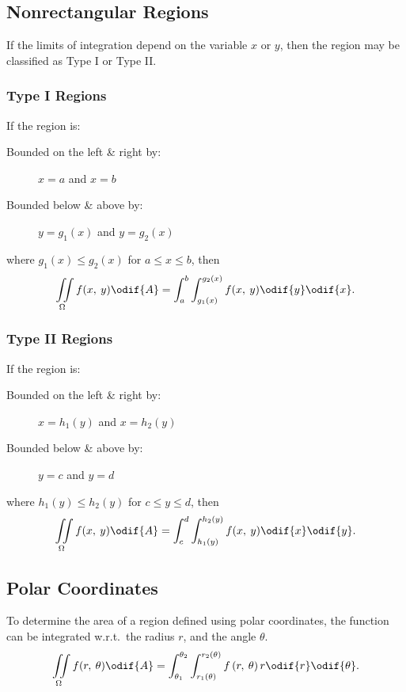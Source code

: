 \documentclass{article}
\begin{document}
\subsection{Nonrectangular Regions}
If the limits of integration depend on the variable \(x\) or \(y\), then the region
may be classified as Type I or Type II\@.
\subsubsection{Type I Regions}
If the region is:
\begin{description}
    \item[Bounded on the left \& right by:] \(x=a\) and \(x=b\)
    \item[Bounded below \& above by:] \(y=g_1(x)\) and \(y=g_2(x)\)
\end{description}
where \(g_1(x) \leq g_2(x)\) for \(a \leq x \leq b\), then
\begin{equation*}
    \iint\limits_{\Omega} f(x,\: y) \odif{A} = \int_a^b\int_{g_1(x)}^{g_2(x)} f(x,\: y) \odif{y} \odif{x}.
\end{equation*}
\subsubsection{Type II Regions}
If the region is:
\begin{description}
    \item[Bounded on the left \& right by:] \(x=h_1(y)\) and \(x=h_2(y)\)
    \item[Bounded below \& above by:] \(y=c\) and \(y=d\)
\end{description}
where \(h_1(y) \leq h_2(y)\) for \(c \leq y \leq d\), then
\begin{equation*}
    \iint\limits_{\Omega} f(x,\: y) \odif{A} = \int_c^d\int_{h_1(y)}^{h_2(y)} f(x,\: y) \odif{x} \odif{y}.
\end{equation*}
\subsection{Polar Coordinates}
To determine the area of a region defined using polar coordinates,
the function can be integrated w.r.t.\ the radius \(r\), and the angle \(\theta\).
\begin{equation*}
    \iint\limits_{\Omega} f(r,\: \theta) \odif{A} = \int_{\theta_1}^{\theta_2}\int_{r_1(\theta)}^{r_2(\theta)} f\left(r,\: \theta\right) r \odif{r} \odif{\theta}.
\end{equation*}
\end{document}
